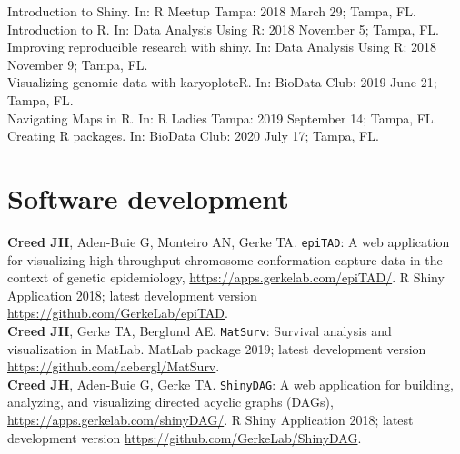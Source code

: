 \documentclass[11pt, a4paper]{article} %
\newcommand{\years}[1]{\marginnote{\scriptsize \raise .3ex\hbox{#1}}} %
\begin{document}
\years{2018} Introduction to Shiny. In: R Meetup Tampa: 2018 March 29; Tampa, FL.\\
\years{2018} Introduction to R. In: Data Analysis Using R: 2018 November 5; Tampa, FL. \\
\years{2018} Improving reproducible research with shiny. In: Data Analysis Using R: 2018 November 9; Tampa, FL. \\
\years{2019} Visualizing genomic data with karyoploteR. In: BioData Club: 2019 June 21; Tampa, FL.\\ 
\years{2019} Navigating Maps in R. In: R Ladies Tampa: 2019 September 14; Tampa, FL.\\ 
\years{2020} Creating R packages. In: BioData Club: 2020 July 17; Tampa, FL. \\



\section*{Software development}

{\bf Creed JH}, Aden-Buie G, Monteiro AN, Gerke TA. \verb|epiTAD|: A web application for visualizing high throughput chromosome conformation capture data in the context of genetic epidemiology, \href{https://apps.gerkelab.com/epiTAD/}{https://apps.gerkelab.com/epiTAD/}. R Shiny Application 2018; latest development version \href{https://github.com/GerkeLab/epiTAD}{https://github.com/GerkeLab/epiTAD}.\\

{\bf Creed JH}, Gerke TA, Berglund AE. \verb|MatSurv|: Survival analysis and visualization in MatLab. MatLab package 2019; latest development version \href{https://github.com/aebergl/MatSurv}{https://github.com/aebergl/MatSurv}. \\ 

{\bf Creed JH}, Aden-Buie G, Gerke TA. \verb|ShinyDAG|: A web application for building, analyzing, and visualizing directed acyclic graphs (DAGs), \href{https://apps.gerkelab.com/shinyDAG/}{https://apps.gerkelab.com/shinyDAG/}. R Shiny Application 2018; latest development version \href{https://github.com/GerkeLab/ShinyDAG}{https://github.com/GerkeLab/ShinyDAG}. \\
\end{document}
